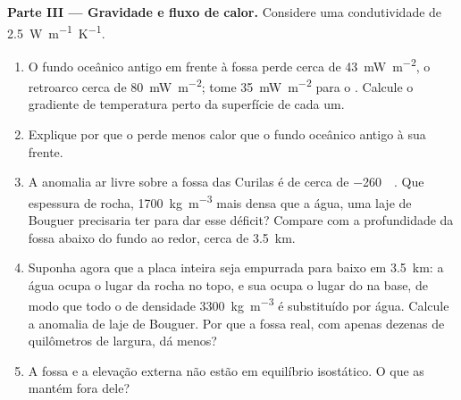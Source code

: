 \begin{problem}
\medskip
\noindent\textbf{Parte III --- Gravidade e fluxo de calor.} Considere uma condutividade de \qty{2.5}{W.m^{-1}.K^{-1}}.
\begin{enumerate}[resume]
  \item O fundo oceânico antigo em frente à fossa perde cerca de \qty{43}{mW.m^{-2}}, o retroarco cerca de \qty{80}{mW.m^{-2}}; tome \qty{35}{mW.m^{-2}} para o . Calcule o gradiente de temperatura perto da superfície de cada um.
  \item Explique por que o  perde menos calor que o fundo oceânico antigo à sua frente.
  \item A anomalia ar livre sobre a fossa das Curilas é de cerca de \qty{-260}{\milli\gal}. Que espessura de rocha, \qty{1700}{kg.m^{-3}} mais densa que a água, uma laje de Bouguer precisaria ter para dar esse déficit? Compare com a profundidade da fossa abaixo do fundo ao redor, cerca de \qty{3.5}{km}.
  \item Suponha agora que a placa inteira seja empurrada para baixo em \qty{3.5}{km}: a água ocupa o lugar da rocha no topo, e sua  ocupa o lugar do  na base, de modo que todo o  de densidade \qty{3300}{kg.m^{-3}} é substituído por água. Calcule a anomalia de laje de Bouguer. Por que a fossa real, com apenas dezenas de quilômetros de largura, dá menos?
  \item A fossa e a elevação externa não estão em equilíbrio isostático. O que as mantém fora dele?
\end{enumerate}


\end{problem}
